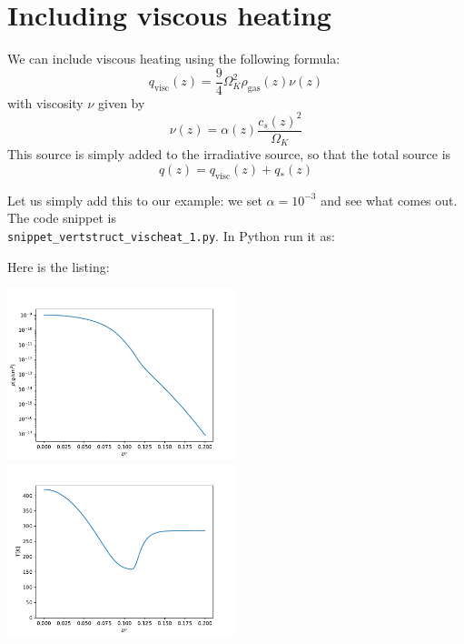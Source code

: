 \documentclass{book}
\newcommand{\code}[1]{{\small\tt #1}}
\begin{document}
\section{Including viscous heating}
We can include viscous heating using the following formula:
\begin{equation}
q_{\mathrm{visc}}(z) = \frac{9}{4}\Omega_K^2\rho_{\mathrm{gas}}(z)\nu(z)
\end{equation}
with viscosity $\nu$ given by
\begin{equation}
\nu(z) = \alpha(z) \frac{c_s(z)^2}{\Omega_K}
\end{equation}
This source is simply added to the irradiative source, so that the total source
is
\begin{equation}
q(z) = q_{\mathrm{visc}}(z) + q_{\mathrm{*}}(z)
\end{equation}

Let us simply add this to our example: we set $\alpha=10^{-3}$ and see what comes out.
The code snippet is\\
\code{snippet\_vertstruct\_vischeat\_1.py}. In Python run it as:
\begin{codebox}
\end{codebox}
Here is the listing:

\centerline{\includegraphics[width=0.5\textwidth]{../snippets/fig_snippet_vertstruct_vischeat_1_1.pdf}
  \includegraphics[width=0.5\textwidth]{../snippets/fig_snippet_vertstruct_vischeat_1_2.pdf}}
\end{document}
